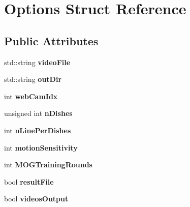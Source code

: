 \hypertarget{structOptions}{\section{Options Struct Reference}
\label{structOptions}
}
\subsection*{Public Attributes}
\begin{DoxyCompactItemize}
\item 
\hypertarget{structOptions_a815c1f3e2dcdece0ef1ee4f27234a758}{std\-::string {\bfseries video\-File}}\label{structOptions_a815c1f3e2dcdece0ef1ee4f27234a758}

\item 
\hypertarget{structOptions_a428a0a33d32984f5b7425b2d11ed3f92}{std\-::string {\bfseries out\-Dir}}\label{structOptions_a428a0a33d32984f5b7425b2d11ed3f92}

\item 
\hypertarget{structOptions_a28bb07e52ddc7413c7b0710a9b3c2b17}{int {\bfseries web\-Cam\-Idx}}\label{structOptions_a28bb07e52ddc7413c7b0710a9b3c2b17}

\item 
\hypertarget{structOptions_a9d688783bef0f0854dc9168fa5471adc}{unsigned int {\bfseries n\-Dishes}}\label{structOptions_a9d688783bef0f0854dc9168fa5471adc}

\item 
\hypertarget{structOptions_aa63b1b70e4954acf9af48225c9975c11}{int {\bfseries n\-Line\-Per\-Dishes}}\label{structOptions_aa63b1b70e4954acf9af48225c9975c11}

\item 
\hypertarget{structOptions_a4256287c28547e3c8f44e853de41fbfc}{int {\bfseries motion\-Sensitivity}}\label{structOptions_a4256287c28547e3c8f44e853de41fbfc}

\item 
\hypertarget{structOptions_acd0bf1ebddabc64d6824209d428de1ee}{int {\bfseries M\-O\-G\-Training\-Rounds}}\label{structOptions_acd0bf1ebddabc64d6824209d428de1ee}

\item 
\hypertarget{structOptions_ad2c3435e77c0a66e10c3f541dfb66b0c}{bool {\bfseries result\-File}}\label{structOptions_ad2c3435e77c0a66e10c3f541dfb66b0c}

\item 
\hypertarget{structOptions_a21fd208622a325f0bfaa6eca9a3c1de9}{bool {\bfseries videos\-Output}}\label{structOptions_a21fd208622a325f0bfaa6eca9a3c1de9}


\end{DoxyCompactItemize}
